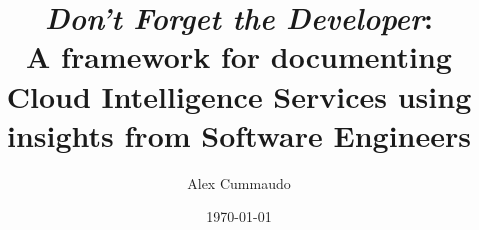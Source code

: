 \title{\textit{Don't Forget the Developer}:\\A framework for documenting Cloud Intelligence Services using insights from Software Engineers}
\author{Alex Cummaudo}
\date{\today}

\def \thedegree {Doctor of Philosophy}
\def \thedepartment {Applied Artificial Intelligence Institute}
\def \theinstitution {Deakin University}
\def \thelocation {Melbourne, Australia}
\def \theauthorspostnominals {BSc \textit{Swinburne}, BIT(Hons)}
